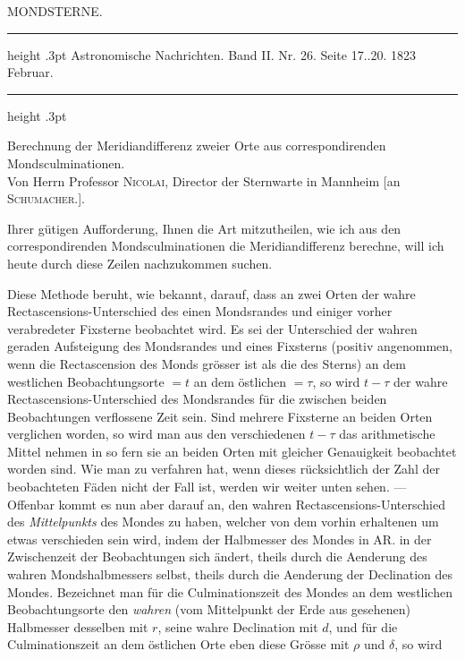 \par\bigskip
{}
\hypertarget{native-448-mondsterne}{}
\begin{center}
{\large MONDSTERNE.}
\end{center}

\begin{center}
\parbox{.78\linewidth}{%
\centering\small
\hrule height .3pt\relax\vspace{2.5pt}
Astronomische Nachrichten. Band II. Nr. 26. Seite 17..20. 1823 Februar.\par
\vspace{2.5pt}\hrule height .3pt\relax
}
\end{center}

\begin{center}
Berechnung der Meridiandifferenz zweier Orte aus correspondirenden Mondsculminationen.\\
Von Herrn Professor \textsc{Nicolai}, Director der Sternwarte in Mannheim [an \textsc{Schumacher.}].
\end{center}

Ihrer gütigen Aufforderung, Ihnen die Art mitzutheilen, wie ich aus den correspondirenden
Mondsculminationen die Meridiandifferenz berechne, will ich heute durch diese Zeilen
nachzukommen suchen.

Diese Methode beruht, wie bekannt, darauf, dass an zwei Orten der wahre
Rectascensions-Unterschied des einen Mondsrandes und einiger vorher verabredeter Fixsterne
beobachtet wird. Es sei der Unterschied der wahren geraden Aufsteigung des Mondsrandes und
eines Fixsterns (positiv angenommen, wenn die Rectascension des Monds grösser ist als die des
Sterns) an dem westlichen Beobachtungsorte $=t$ an dem östlichen $=\tau$, so wird $t-\tau$ der
wahre Rectascensions-Unterschied des Mondsrandes für die zwischen beiden Beobachtungen
verflossene Zeit sein. Sind mehrere Fixsterne an beiden Orten verglichen worden, so wird man
aus den verschiedenen $t-\tau$ das arithmetische Mittel nehmen in so fern sie an beiden Orten
mit gleicher Genauigkeit beobachtet worden sind. Wie man zu verfahren hat, wenn dieses
rücksichtlich der Zahl der beobachteten Fäden nicht der Fall ist, werden wir weiter unten
sehen. --- Offenbar kommt es nun aber darauf an, den wahren Rectascensions-Unterschied des
\emph{Mittelpunkts} des Mondes zu haben, welcher von dem vorhin erhaltenen um etwas
verschieden sein wird, indem der Halbmesser des Mondes in AR. in der Zwischenzeit der
Beobachtungen sich ändert, theils durch die Aenderung des wahren Mondshalbmessers selbst,
theils durch die Aenderung der Declination des Mondes. Bezeichnet man für die Culminationszeit
des Mondes an dem westlichen Beobachtungsorte den \emph{wahren} (vom Mittelpunkt der Erde aus
gesehenen) Halbmesser desselben mit $r$, seine wahre Declination mit $d$, und für die
Culminationszeit an dem östlichen Orte eben diese Grösse mit $\rho$ und $\delta$, so wird


